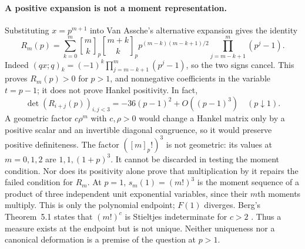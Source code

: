 \paragraph{A positive expansion is not a moment representation.}
Substituting $x=p^{m+1}$ into Van Assche's alternative expansion
\cite[(16), p.~4]{vanassche2001} gives the identity
\[
 R_m(p)=\sum_{k=0}^m\genfrac{[}{]}{0pt}{}{m}{k}_p\genfrac{[}{]}{0pt}{}{m+k}{k}_p
 p^{(m-k)(m-k+1)/2}\prod_{j=m-k+1}^{m}(p^j-1).
\]
Indeed $(qx;q)_k=(-1)^k\prod_{j=m-k+1}^m(p^j-1)$, so the two signs cancel.
This proves $R_m(p)>0$ for $p>1$, and nonnegative coefficients in the
variable $t=p-1$; it does not prove Hankel positivity. In fact,
\[
 \det(R_{i+j}(p))_{i,j<3}=-36(p-1)^2+O((p-1)^3)
 \quad(p\downarrow1).
\]
A geometric factor $c\rho^m$ with $c,\rho>0$ would change a Hankel
matrix only by a positive scalar and an invertible diagonal congruence,
so it would preserve positive definiteness. The factor $([m]_p!)^3$
is not geometric: its values at $m=0,1,2$ are $1,1,(1+p)^3$.
It cannot be discarded in testing the moment condition. Nor does its
positivity alone prove that multiplication by it repairs the failed
condition for $R_m$. At $p=1$, $s_m(1)=(m!)^3$ is the moment sequence of a
product of three independent unit exponential variables, since their
$m$th moments multiply. This is only the polynomial endpoint; $F(1)$
diverges. Berg's Theorem~5.1 states that $(m!)^c$ is Stieltjes indeterminate
for $c>2$ \cite{berg2007}. Thus a measure exists at the endpoint but is not
unique. Neither uniqueness nor a canonical deformation is a premise of
the question at $p>1$.

